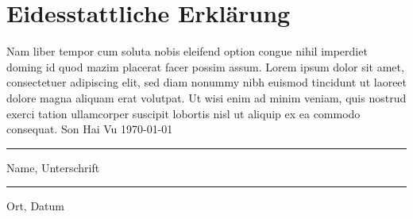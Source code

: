 \documentclass[a4paper, 12pt]{report}
\begin{document}
	

	
	
	\listoffigures

	\chapter{Eidesstattliche Erklärung}  
	Nam liber tempor cum soluta nobis eleifend option congue nihil imperdiet doming id quod mazim placerat facer possim assum. Lorem ipsum dolor sit amet, consectetuer adipiscing elit, sed diam nonummy nibh euismod tincidunt ut laoreet dolore magna aliquam erat volutpat. Ut wisi enim ad minim veniam, quis nostrud exerci tation ullamcorper suscipit lobortis nisl ut aliquip ex ea commodo consequat. 
	\vfill
	Son Hai Vu \hfill \today
	
	\begin{minipage}{5cm}
		\hrule
		\vskip3mm
		Name, Unterschrift
	\end{minipage} \hfill
	\begin{minipage}{5cm}
		\hrule
		\vskip3mm
		\hfill Ort, Datum
	\end{minipage}
\end{document}
